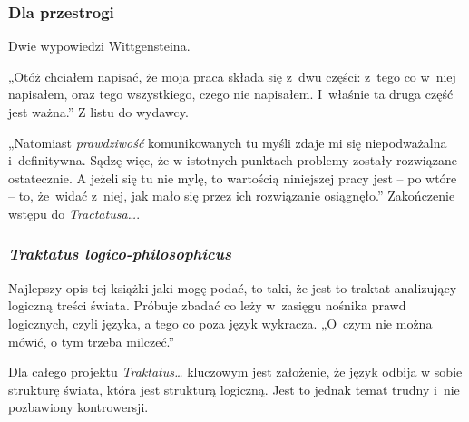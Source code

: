 \documentclass[10pt,t]{beamer}
\begin{document}
\begin{frame}
  \frametitle{Dla przestrogi}


  Dwie wypowiedzi Wittgensteina.


  „Otóż chciałem napisać, że moja praca składa się z~dwu części:
  z~tego co w~niej napisałem, oraz tego wszystkiego, czego nie napisałem.
  I~właśnie ta druga część jest ważna.” Z listu do wydawcy.

  „Natomiast \textit{prawdziwość} komunikowanych tu myśli zdaje
  mi się niepodważalna i~definitywna. Sądzę więc, że w istotnych
  punktach problemy zostały rozwiązane ostatecznie. A jeżeli się
  tu nie mylę, to wartością niniejszej pracy jest -- po wtóre --
  to, że~widać z~niej, jak mało się przez ich rozwiązanie
  osiągnęło.” Zakończenie wstępu do \textit{Tractatusa\ldots}.

\end{frame}





\begin{frame}
  \frametitle{\textit{Traktatus logico-philosophicus}}


  Najlepszy opis tej książki jaki mogę podać, to taki, że jest to traktat
  analizujący logiczną treści świata. Próbuje zbadać co leży w~zasięgu
  nośnika prawd logicznych, czyli języka, a tego co poza język wykracza.
  „O~czym nie można mówić, o tym trzeba milczeć.”

  Dla całego projektu \textit{Traktatus\ldots} kluczowym jest założenie, że
  język odbija w sobie strukturę świata, która jest strukturą logiczną.
  Jest to jednak temat trudny i~nie pozbawiony kontrowersji.

\end{frame}
\end{document}
